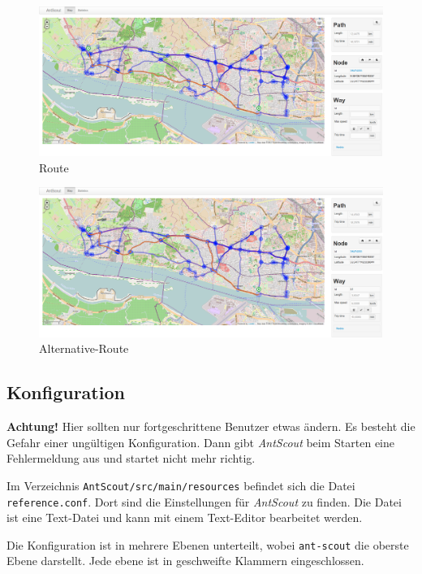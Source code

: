 \documentclass[
  a4paper,
  10pt
]{scrreprt}
\begin{document}
\begin{figure}[htbp]
  \centering
  \includegraphics[width=\textwidth]{Bilder/Route.png}
  \caption{Route}
  \label{fig:route}
\end{figure}

\begin{figure}[htbp]
  \centering
  \includegraphics[width=\textwidth]{Bilder/Alternative-Route.png}
  \caption{Alternative-Route}
  \label{fig:alternative-route}
\end{figure}

\subsection{Konfiguration}
\label{sec:konfiguration}

\textbf{Achtung!}
Hier sollten nur fortgeschrittene Benutzer etwas ändern.
Es besteht die Gefahr einer ungültigen Konfiguration.
Dann gibt \textit{AntScout} beim Starten eine Fehlermeldung aus und startet nicht mehr richtig.

Im Verzeichnis \texttt{AntScout/src/main/resources} befindet sich die Datei \texttt{reference.conf}.
Dort sind die Einstellungen für \textit{AntScout} zu finden.
Die Datei ist eine Text-Datei und kann mit einem Text-Editor bearbeitet werden.

Die Konfiguration ist in mehrere Ebenen unterteilt, wobei \texttt{ant-scout} die oberste Ebene darstellt.
Jede ebene ist in geschweifte Klammern eingeschlossen.
\end{document}
